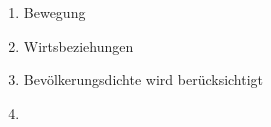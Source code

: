 \begin{enumerate}
\item{Bewegung}
\item{Wirtsbeziehungen}
\item{Bevölkerungsdichte wird berücksichtigt}
\item{}
\end{enumerate}